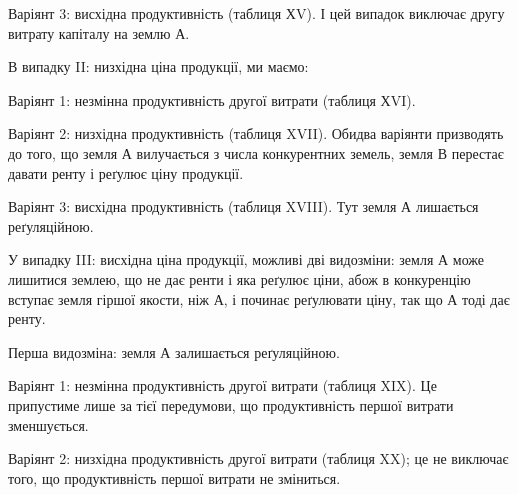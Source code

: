Варіянт 3: висхідна продуктивність (таблиця ХV). І цей випадок виключає
другу витрату капіталу на землю $А$.

В випадку II: низхідна ціна продукції, ми маємо:

Варіянт 1: незмінна продуктивність другої витрати (таблиця ХVI).

Варіянт 2: низхідна продуктивність (таблиця XVII). Обидва варіянти призводять
до того, що земля $А$ вилучається з числа конкурентних земель, земля
$В$ перестає давати ренту і реґулює ціну продукції.

Варіянт 3: висхідна продуктивність (таблиця XVIII). Тут земля $А$ лишається
реґуляційною.

У випадку III: висхідна ціна продукції, можливі дві видозміни: земля
$А$ може лишитися землею, що не дає ренти і яка реґулює ціни, абож в конкуренцію
вступає земля гіршої якости, ніж $А$, і починає реґулювати ціну, так що $А$
тоді дає ренту.

Перша видозміна: земля $А$ залишається реґуляційною.

Варіянт 1: незмінна продуктивність другої витрати (таблиця XIX). Це припустиме
лише за тієї передумови, що продуктивність першої витрати
зменшується.

Варіянт 2: низхідна продуктивність другої витрати (таблиця XX); це не виключає
того, що продуктивність першої витрати не зміниться.
